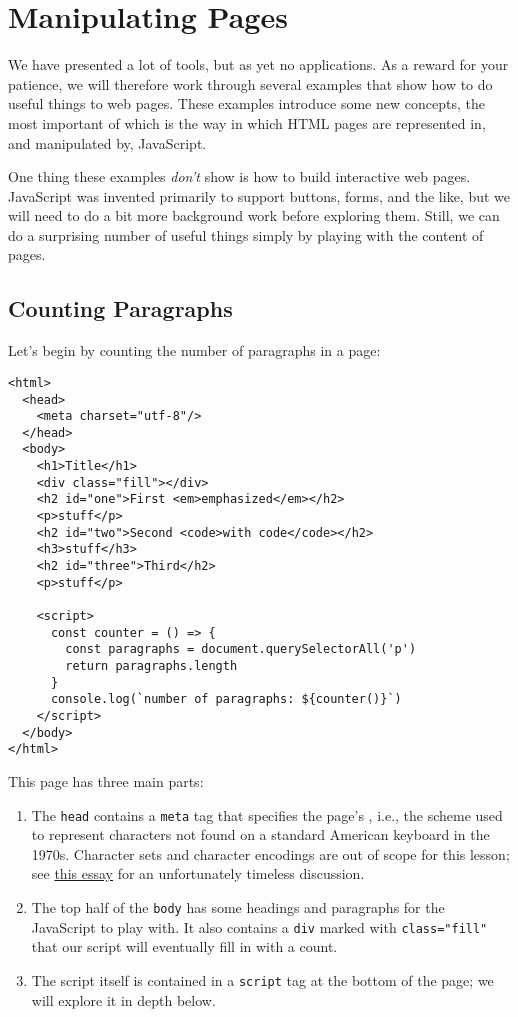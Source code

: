 \chapter{Manipulating Pages}\label{s:pages}

We have presented a lot of tools, but as yet no applications.
As a reward for your patience,
we will therefore work through several examples that show
how to do useful things to web pages.
These examples introduce some new concepts,
the most important of which is the way in which HTML pages are represented in,
and manipulated by,
JavaScript.

One thing these examples \emph{don't} show is how to build interactive web pages.
JavaScript was invented primarily to support buttons, forms, and the like,
but we will need to do a bit more background work before exploring them.
Still,
we can do a surprising number of useful things
simply by playing with the content of pages.

\section{Counting Paragraphs}\label{s:pages-counting}

Let's begin by counting the number of paragraphs in a page:

\begin{verbatim}
<html>
  <head>
    <meta charset="utf-8"/>
  </head>
  <body>
    <h1>Title</h1>
    <div class="fill"></div>
    <h2 id="one">First <em>emphasized</em></h2>
    <p>stuff</p>
    <h2 id="two">Second <code>with code</code></h2>
    <h3>stuff</h3>
    <h2 id="three">Third</h2>
    <p>stuff</p>

    <script>
      const counter = () => {
        const paragraphs = document.querySelectorAll('p')
        return paragraphs.length
      }
      console.log(`number of paragraphs: ${counter()}`)
    </script>
  </body>
</html>
\end{verbatim}

This page has three main parts:

\begin{enumerate}
\item
  The \texttt{head} contains a \texttt{meta} tag that specifies the page's
  ,
  i.e.,
  the scheme used to represent characters
  not found on a standard American keyboard in the 1970s.
  Character sets and character encodings are out of scope for this lesson;
  see \href{https://www.joelonsoftware.com/2003/10/08/the-absolute-minimum-every-software-developer-absolutely-positively-must-know-about-unicode-and-character-sets-no-excuses/}{this essay} for an unfortunately timeless discussion.
\item
  The top half of the \texttt{body} has some headings and paragraphs
  for the JavaScript to play with.
  It also contains a \texttt{div} marked with \texttt{class="fill"}
  that our script will eventually fill in with a count.
\item
  The script itself is contained in a \texttt{script} tag at the bottom of the page;
  we will explore it in depth below.
\end{enumerate}


